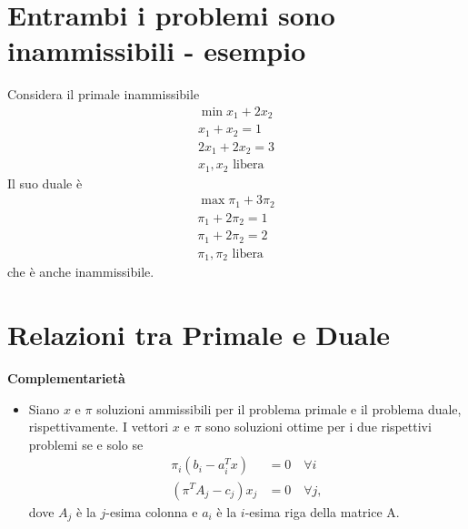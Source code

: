 \documentclass[a4paper, 11pt]{article}
\begin{document}
        \section*{Entrambi i problemi sono inammissibili - esempio}
        Considera il primale inammissibile
        \begin{align*}
            \min x_1 + 2x_2 \\
            x_1 + x_2 = 1 \\
            2x_1 + 2x_2 = 3 \\
            x_1, x_2 \text{ libera }
        \end{align*}
        Il suo duale è
        \begin{align*}
            \max \pi_1 + 3\pi_2 \\
            \pi_1 + 2\pi_2 = 1 \\
            \pi_1 + 2\pi_2 = 2 \\
            \pi_1, \pi_2 \text{ libera }
        \end{align*}
        che è anche inammissibile.
        
        \section*{Relazioni tra Primale e Duale}
        \textbf{Complementarietà}
        \begin{itemize}
            \item Siano $x$ e $\pi$ soluzioni ammissibili per il problema primale e il problema duale, rispettivamente. I vettori $x$ e $\pi$ sono soluzioni ottime per i due rispettivi problemi se e solo se
            \begin{align*}
                \pi_i(b_i - a^T_i x) &= 0 \quad \forall i \\
                (\pi^T A_j - c_j)x_j &= 0 \quad \forall j,
            \end{align*}
            dove $A_j$ è la $j$-esima colonna e $a_i$ è la $i$-esima riga della matrice A.
        \end{itemize}
        
\end{document}
